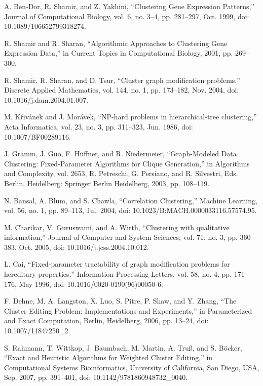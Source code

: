 \documentclass[12pt,oneside,english,parskip=full,headings=small]{scrbook}
\theoremstyle{definition}
\begin{document}
\begin{thebibliography}{99}

A. Ben-Dor, R. Shamir, and Z. Yakhini, “Clustering Gene Expression Patterns,” Journal of
Computational Biology, vol. 6, no. 3–4, pp. 281–297, Oct. 1999, doi: 10.1089/106652799318274.

R. Shamir and R. Sharan, “Algorithmic Approaches to Clustering Gene Expression Data,” in Current
Topics in Computational Biology, 2001, pp. 269–300.

R. Shamir, R. Sharan, and D. Tsur, “Cluster graph modification problems,” Discrete Applied
Mathematics, vol. 144, no. 1, pp. 173–182, Nov. 2004, doi: 10.1016/j.dam.2004.01.007.

M. Křivánek and J. Morávek, “NP-hard problems in hierarchical-tree clustering,” Acta Informatica,
vol. 23, no. 3, pp. 311–323, Jun. 1986, doi: 10.1007/BF00289116.

J. Gramm, J. Guo, F. Hüffner, and R. Niedermeier, “Graph-Modeled Data Clustering: Fixed-Parameter
Algorithms for Clique Generation,” in Algorithms and Complexity, vol. 2653, R. Petreschi, G.
Persiano, and R. Silvestri, Eds. Berlin, Heidelberg: Springer Berlin Heidelberg, 2003, pp. 108–119.

N. Bansal, A. Blum, and S. Chawla, “Correlation Clustering,” Machine Learning, vol. 56, no. 1,
pp. 89–113, Jul. 2004, doi: 10.1023/B:MACH.0000033116.57574.95.

M. Charikar, V. Guruswami, and A. Wirth, “Clustering with qualitative information,” Journal of
Computer and System Sciences, vol. 71, no. 3, pp. 360–383, Oct. 2005, doi:
10.1016/j.jcss.2004.10.012.

L. Cai, “Fixed-parameter tractability of graph modification problems for hereditary properties,”
Information Processing Letters, vol. 58, no. 4, pp. 171–176, May 1996, doi:
10.1016/0020-0190(96)00050-6.

F. Dehne, M. A. Langston, X. Luo, S. Pitre, P. Shaw, and Y. Zhang, “The Cluster Editing Problem:
Implementations and Experiments,” in Parameterized and Exact Computation, Berlin, Heidelberg, 2006,
pp. 13–24, doi: 10.1007/11847250\_2.

S. Rahmann, T. Wittkop, J. Baumbach, M. Martin, A. Truß, and S. Böcker, “Exact and Heuristic
Algorithms for Weighted Cluster Editing,” in Computational Systems Bioinformatics, University of
California, San Diego, USA, Sep. 2007, pp. 391–401, doi: 10.1142/9781860948732\_0040.


\end{thebibliography}
\end{document}
